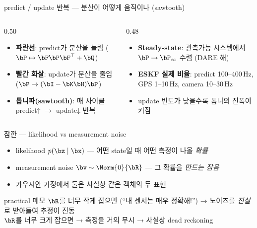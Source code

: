 \begin{frame}{predict / update 반복 — 분산이 어떻게 움직이나 (sawtooth)}
  \begin{columns}[T]
    \begin{column}{0.50\textwidth}
      \scriptsize
      \begin{itemize}
        \item \textbf{파란선}: predict가 분산을 늘림 ($\bP \mapsto \bF\bP\bF^\top + \bQ$)
        \item \textbf{빨간 화살}: update가 분산을 줄임 ($\bP \mapsto (\bI-\bK\bH)\bP$)
        \item \textbf{톱니파(sawtooth)}: 매 사이클 predict↑ $\to$ update↓ 반복
      \end{itemize}
    \end{column}
    \begin{column}{0.48\textwidth}
      \scriptsize
      \begin{itemize}
        \item \textbf{Steady-state}: 관측가능 시스템에서 $\bP \to \bP_\infty$ 수렴 (DARE 해)
        \item \textbf{ESKF 실제 비율}: predict 100--400\,Hz, GPS 1--10\,Hz, camera 10--30\,Hz
        \item update 빈도가 낮을수록 톱니의 진폭이 커짐
      \end{itemize}
    \end{column}
  \end{columns}
\end{frame}

\begin{frame}{잠깐 — likelihood vs measurement noise}
  \begin{itemize}
    \item likelihood $p(\bz \mid \bx)$ — 어떤 state일 때 어떤 측정이 나올 \emph{확률}
    \item measurement noise $\bv \sim \Norm{0}{\bR}$ — 그 확률을 \emph{만드는 잡음}
    \item 가우시안 가정에서 둘은 사실상 같은 객체의 두 표현
  \end{itemize}
  \pause
  \vspace{0.4em}
  \begin{block}{practical 메모}
    $\bR$를 너무 작게 잡으면 (``내 센서는 매우 정확해!'') → 노이즈를 \emph{진실}로 받아들여 추정이 진동\\
    $\bR$를 너무 크게 잡으면 → 측정을 거의 무시 → 사실상 dead reckoning
  \end{block}
\end{frame}

